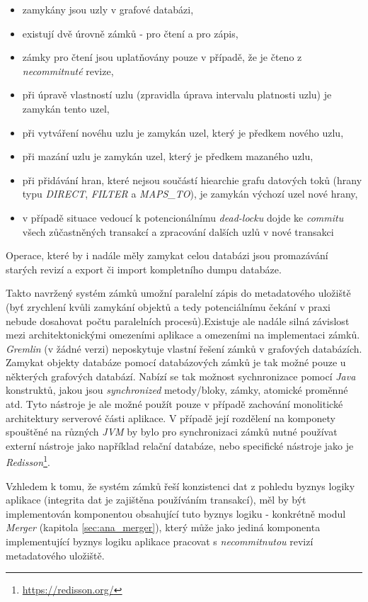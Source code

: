 \begin{itemize}
   \item zamykány jsou uzly v grafové databázi,
   \item existují dvě úrovně zámků - pro čtení a pro zápis,
   \item zámky pro čtení jsou uplatňovány pouze v případě, že je čteno z \textit{necommitnuté} revize,
   \item při úpravě vlastností uzlu (zpravidla úprava intervalu platnosti uzlu) je zamykán tento uzel,
   \item při vytváření novéhu uzlu je zamykán uzel, který je předkem nového uzlu,
   \item při mazání uzlu je zamykán uzel, který je předkem mazaného uzlu,
   \item při přidávání hran, které nejsou součástí hiearchie grafu datových toků (hrany typu \textit{DIRECT}, \textit{FILTER} a \textit{MAPS\_TO}), je zamykán výchozí uzel nové hrany,
   \item v případě situace vedoucí k potencionálnímu \textit{dead-locku} dojde ke \textit{commitu} všech zůčastněných transakcí a zpracování dalších uzlů v nové transakci
\end{itemize}

Operace, které by i nadále měly zamykat celou databázi jsou promazávání starých revizí a export či import kompletního dumpu databáze.

Takto navržený systém zámků umožní paralelní zápis do metadatového uložiště (byť zrychlení kvůli zamykání objektů a tedy potenciálnímu čekání v praxi nebude dosahovat počtu paralelních procesů).Existuje ale nadále silná závislost mezi architektonickými omezeními aplikace a omezeními na implementaci zámků. \textit{Gremlin} (v žádné verzi) neposkytuje vlastní řešení zámků v grafových databázích. Zamykat objekty databáze pomocí databázových zámků je tak možné pouze u některých grafových databází. Nabízí se tak možnost sychnronizace pomocí \textit{Java} konstruktů, jakou jsou \textit{synchronized} metody/bloky, zámky, atomické proměnné atd. Tyto nástroje je ale možné použít pouze v případě zachování monolitické architektury serverové části aplikace. V případě její rozdělení na  komponety spouštěné na různých \textit{JVM} by bylo pro synchronizaci zámků nutné používat externí nástroje jako například relační databáze, nebo specifické nástroje jako je \textit{Redisson}\footnote{\url{https://redisson.org/}}.

Vzhledem k tomu, že systém zámků řeší konzistenci dat z pohledu byznys logiky aplikace (integrita dat je zajištěna používáním transakcí), měl by být implementován komponentou obsahující tuto byznys logiku - konkrétně modul \textit{Merger} (kapitola \ref{sec:ana_merger}), který může jako jediná komponenta implementující byznys logiku aplikace pracovat s \textit{necommitnutou} revizí metadatového uložiště.

